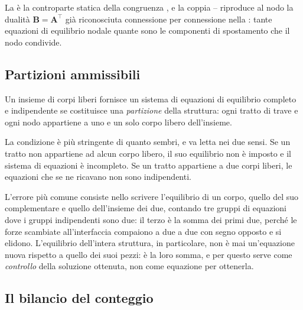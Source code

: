 \begin{oss}
	La  è la
	controparte statica della congruenza
	, e la coppia
	--
	riproduce al nodo la dualità $\bm{B} = \bm{A}^{\top}$
	già riconosciuta connessione per connessione nella
	: tante equazioni di equilibrio
	nodale quante sono le componenti di spostamento che il
	nodo condivide.
\end{oss}


\subsection{Partizioni ammissibili}
\label{subsec:partizioni_ammissibili}

Un insieme di corpi liberi fornisce un sistema di equazioni
di equilibrio completo e indipendente se costituisce una
\emph{partizione} della struttura: ogni tratto di trave e
ogni nodo appartiene a uno e un solo corpo libero
dell'insieme.

La condizione è più stringente di quanto sembri, e va letta
nei due sensi. Se un tratto non appartiene ad alcun corpo
libero, il suo equilibrio non è imposto e il sistema di
equazioni è incompleto. Se un tratto appartiene a due corpi
liberi, le equazioni che se ne ricavano non sono
indipendenti.

\begin{oss}
	L'errore più comune consiste nello scrivere l'equilibrio
	di un corpo, quello del suo complementare e quello
	dell'insieme dei due, contando tre gruppi di equazioni
	dove i gruppi indipendenti sono due: il terzo è la somma
	dei primi due, perché le forze scambiate all'interfaccia
	compaiono a due a due con segno opposto e si elidono.
	L'equilibrio dell'intera struttura, in particolare, non è
	mai un'equazione nuova rispetto a quello dei suoi pezzi:
	è la loro somma, e per questo serve come \emph{controllo}
	della soluzione ottenuta, non come equazione per
	ottenerla.
\end{oss}


\subsection{Il bilancio del conteggio}
\label{subsec:bilancio_partizione}

